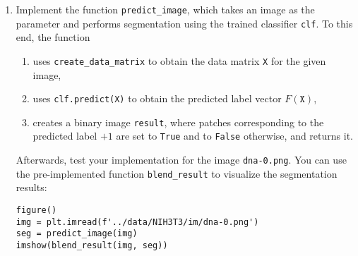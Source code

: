 \documentclass[12pt,a4paper]{article}
\begin{document}
\begin{enumerate}
\begin{enumerate}
    \end{enumerate}
    \item Implement the function \texttt{predict\_image}, which takes an image as the parameter and performs segmentation using the trained classifier \texttt{clf}. To this end, the function
    \begin{enumerate}
        \item uses \texttt{create\_data\_matrix} to obtain the data matrix \texttt{X} for the given image,
        \item uses \texttt{clf.predict(X)} to obtain the predicted label vector $F\left(\texttt{X}\right)$,
        \item creates a binary image \texttt{result}, where patches corresponding to the predicted label $+1$ are set to \texttt{True} and to \texttt{False} otherwise, and returns it.
    \end{enumerate}
    Afterwards, test your implementation for the image \texttt{dna-0.png}. You can use the pre-implemented function \texttt{blend\_result} to visualize the segmentation results:
\begin{Verbatim}[frame=single]
figure()
img = plt.imread(f'../data/NIH3T3/im/dna-0.png')
seg = predict_image(img)
imshow(blend_result(img, seg))
\end{Verbatim}

\end{enumerate}
\end{document}
